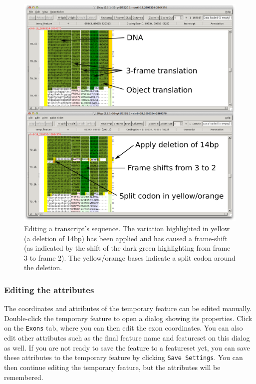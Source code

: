 \documentclass[letterpaper]{article}
\begin{document}
\begin{figure}
\centering
\color[rgb]{0.30980393,0.5058824,0.7411765}
\includegraphics[width=15.231cm]{images/edit_sequence.png}
\caption{Editing a transcript's sequence. The variation highlighted in yellow (a deletion of 14bp) has been applied and has caused a frame-shift (as indicated by the shift of the dark green highlighting from frame 3 to frame 2). The yellow/orange bases indicate a split codon around the deletion.}
\label{img_edit_sequence}
\end{figure}

\subsubsection{Editing the attributes} \label{sec_annotation_attributes}
The coordinates and attributes of the temporary feature can be edited manually. Double-click the temporary feature to open a dialog showing its properties. Click on the \lstinline{Exons} tab, where you can then edit the exon coordinates. You can also edit other attributes such as the final feature name and featureset on this dialog as well. If you are not ready to save the feature to a featureset yet, you can save these attributes to the temporary feature by clicking \lstinline{Save Settings}. You can then continue editing the temporary feature, but the attributes will be remembered.
\end{document}
